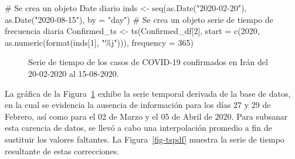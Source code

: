 \documentclass[
  us-letterpaper,
]{scrreprt}
\newenvironment{Shaded}{\begin{snugshade}}{\end{snugshade}}
\newcommand{\AttributeTok}[1]{\textcolor[rgb]{0.40,0.45,0.13}{#1}}
\newcommand{\CommentTok}[1]{\textcolor[rgb]{0.37,0.37,0.37}{#1}}
\newcommand{\DecValTok}[1]{\textcolor[rgb]{0.68,0.00,0.00}{#1}}
\newcommand{\FunctionTok}[1]{\textcolor[rgb]{0.28,0.35,0.67}{#1}}
\newcommand{\NormalTok}[1]{\textcolor[rgb]{0.00,0.23,0.31}{#1}}
\newcommand{\OtherTok}[1]{\textcolor[rgb]{0.00,0.23,0.31}{#1}}
\newcommand{\StringTok}[1]{\textcolor[rgb]{0.13,0.47,0.30}{#1}}
\theoremstyle{plain}
\theoremstyle{definition}
\theoremstyle{definition}
\theoremstyle{plain}
\theoremstyle{remark}
\begin{document}
\begin{Shaded}
\begin{Highlighting}[]
\CommentTok{\# Se crea un objeto \textquotesingle{}Date\textquotesingle{} diario}
\NormalTok{inds }\OtherTok{\textless{}{-}} \FunctionTok{seq}\NormalTok{(}\FunctionTok{as.Date}\NormalTok{(}\StringTok{"2020{-}02{-}20"}\NormalTok{), }\FunctionTok{as.Date}\NormalTok{(}\StringTok{"2020{-}08{-}15"}\NormalTok{), }\AttributeTok{by =} \StringTok{"day"}\NormalTok{)}
\CommentTok{\# Se crea un objeto \textquotesingle{}serie de tiempo\textquotesingle{} de frecuencia diaria}
\NormalTok{Confirmed\_ts }\OtherTok{\textless{}{-}} \FunctionTok{ts}\NormalTok{(Confirmed\_df[}\DecValTok{2}\NormalTok{], }
                   \AttributeTok{start =} \FunctionTok{c}\NormalTok{(}\DecValTok{2020}\NormalTok{, }\FunctionTok{as.numeric}\NormalTok{(}\FunctionTok{format}\NormalTok{(inds[}\DecValTok{1}\NormalTok{], }\StringTok{"\%j"}\NormalTok{))),}
                   \AttributeTok{frequency =} \DecValTok{365}\NormalTok{)}
\end{Highlighting}
\end{Shaded}

\begin{figure}


\caption{\label{fig-oripdf}Serie de tiempo de los casos de COVID-19
confirmados en Irán del 20-02-2020 al 15-08-2020.}

\end{figure}%

La gráfica de la Figura~\ref{fig-oripdf} exhibe la serie temporal
derivada de la base de datos, en la cual se evidencia la ausencia de
información para los días 27 y 29 de Febrero, así como para el 02 de
Marzo y el 05 de Abril de 2020. Para subsanar esta carencia de datos, se
llevó a cabo una interpolación promedio a fin de sustituir los valores
faltantes. La Figura~\ref{fig-tspdf} muestra la serie de tiempo
resultante de estas correcciones.
\end{document}

